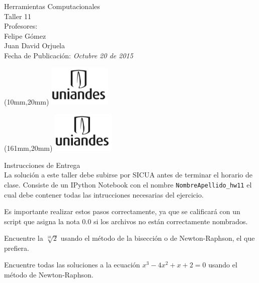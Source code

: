 \documentclass[11pt,letterpaper]{exam}
\begin{document}
\begin{center}
{\Large Herramientas Computacionales \\
 Taller 11}\\
Profesores: \\ Felipe G\'omez\\ Juan David Orjuela \\
Fecha de Publicación: {\small \it Octubre 20 de 2015}\\
\end{center}

\begin{textblock*}{40mm}(10mm,20mm)
  \includegraphics[width=3cm]{logoUniandes.png}
\end{textblock*}

\begin{textblock*}{40mm}(161mm,20mm)
  \includegraphics[width=3cm]{logoUniandes.png}
\end{textblock*}

\vspace{0.5cm}

{\Large Instrucciones de Entrega}\\

\noindent
La solución a este taller debe subirse por SICUA antes de terminar 
el horario de clase.
\noindent
Consiste de un IPython Notebook con el nombre
\verb"NombreApellido_hw11"
el cual debe contener todas las intrucciones necesarias del ejercicio.

Es importante realizar estos pasos correctamente, ya que se calificará con un
script que asigna la nota 0.0 si los archivos no están correctamente nombrados.


\begin{questions}


Encuentre la $\sqrt[10]{2} $ usando el método de la bisección o de Newton-Raphson, el que prefiera.


Encuentre todas las soluciones a la ecuación $x^3 - 4x^2 + x  +2 = 0$ usando el método de Newton-Raphson. 

\end{questions}
\end{document}

